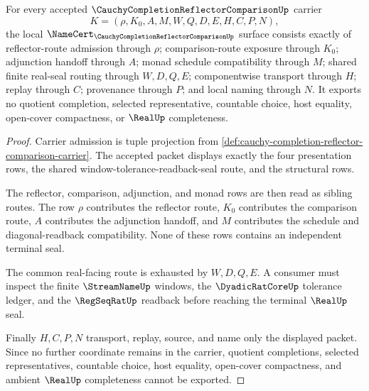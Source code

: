 \begin{theorem}
\label{thm:cauchy-completion-reflector-comparison-namecert-obligations}
For every accepted $\CauchyCompletionReflectorComparisonUp$ carrier
$$
K=(\rho,K_0,A,M,W,Q,D,E,H,C,P,N),
$$
the local $\NameCert_{\CauchyCompletionReflectorComparisonUp}$ surface consists exactly of reflector-route admission through $\rho$; comparison-route exposure through $K_0$; adjunction handoff through $A$; monad schedule compatibility through $M$; shared finite real-seal routing through $W,D,Q,E$; componentwise transport through $H$; replay through $C$; provenance through $P$; and local naming through $N$. It exports no quotient completion, selected representative, countable choice, host equality, open-cover compactness, or $\RealUp$ completeness.
\end{theorem}
\begin{proof}
Carrier admission is tuple projection from \autoref{def:cauchy-completion-reflector-comparison-carrier}. The accepted packet displays exactly the four presentation rows, the shared window-tolerance-readback-seal route, and the structural rows.

The reflector, comparison, adjunction, and monad rows are then read as sibling routes. The row $\rho$ contributes the reflector route, $K_0$ contributes the comparison route, $A$ contributes the adjunction handoff, and $M$ contributes the schedule and diagonal-readback compatibility. None of these rows contains an independent terminal seal.

The common real-facing route is exhausted by $W,D,Q,E$. A consumer must inspect the finite $\StreamNameUp$ windows, the $\DyadicRatCoreUp$ tolerance ledger, and the $\RegSeqRatUp$ readback before reaching the terminal $\RealUp$ seal.

Finally $H,C,P,N$ transport, replay, source, and name only the displayed packet. Since no further coordinate remains in the carrier, quotient completions, selected representatives, countable choice, host equality, open-cover compactness, and ambient $\RealUp$ completeness cannot be exported.
\end{proof}


